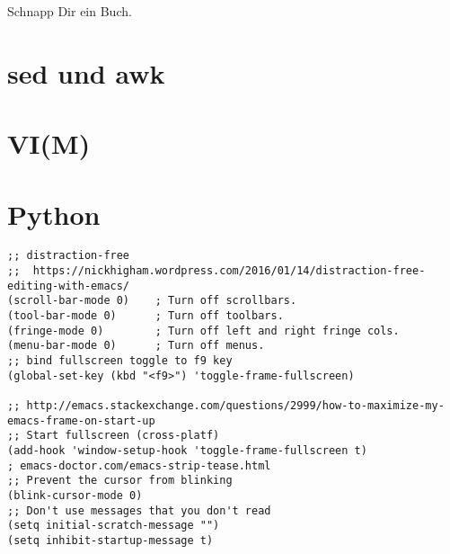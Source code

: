 \documentclass[12pt,ngerman]{scrbook}
\begin{document}
Schnapp Dir ein Buch.

\section{sed und awk}

\section{VI(M)}



\section{Python}

\backmatter

\blindtext

\begin{lstlisting}[basicstyle=\ttfamily] % <--- here
;; distraction-free
;;  https://nickhigham.wordpress.com/2016/01/14/distraction-free-editing-with-emacs/
(scroll-bar-mode 0)    ; Turn off scrollbars.
(tool-bar-mode 0)      ; Turn off toolbars.
(fringe-mode 0)        ; Turn off left and right fringe cols.
(menu-bar-mode 0)      ; Turn off menus.
;; bind fullscreen toggle to f9 key
(global-set-key (kbd "<f9>") 'toggle-frame-fullscreen)

;; http://emacs.stackexchange.com/questions/2999/how-to-maximize-my-emacs-frame-on-start-up
;; Start fullscreen (cross-platf)
(add-hook 'window-setup-hook 'toggle-frame-fullscreen t)
; emacs-doctor.com/emacs-strip-tease.html
;; Prevent the cursor from blinking
(blink-cursor-mode 0)
;; Don't use messages that you don't read
(setq initial-scratch-message "")
(setq inhibit-startup-message t)
\end{lstlisting}

\nocite{*}

\printbibliography 
\end{document}
